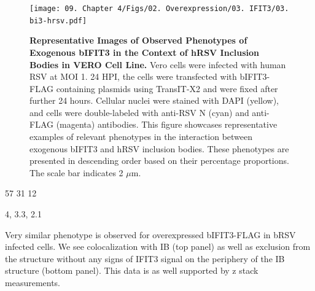\begin{figure}
    \centering
    \texttt{[image: 09. Chapter 4/Figs/02. Overexpression/03. IFIT3/03. bi3-hrsv.pdf]}
    \caption[Representative Images of Observed Phenotypes of Exogenous bIFIT3 in the Context of hRSV Inclusion Bodies in VERO Cell Line.]{\textbf{Representative Images of Observed Phenotypes of Exogenous bIFIT3 in the Context of hRSV Inclusion Bodies in VERO Cell Line.} Vero cells were infected with human RSV at MOI 1. 24 HPI, the cells were transfected with bIFIT3-FLAG containing plasmids using TransIT-X2 and were fixed after further 24 hours. Cellular nuclei were stained with DAPI (yellow), and cells were double-labeled with anti-RSV N (cyan) and anti-FLAG (magenta) antibodies. This figure showcases representative examples of relevant phenotypes in the interaction between exogenous bIFIT3 and hRSV inclusion bodies. These phenotypes are presented in descending order based on their percentage proportions. The scale bar indicates 2 \(\mu \mbox{m}\).}
    \label{fig:Representative Images of Observed Phenotypes of Exogenous bIFIT3 in the Context of hRSV Inclusion Bodies in VERO Cell Line}
\end{figure}

57 31 12

4, 3.3, 2.1

Very similar phenotype is observed for overexpressed bIFIT3-FLAG in bRSV infected cells. We see colocalization with IB (top panel) as well as exclusion from the structure without any signs of IFIT3 signal on the periphery of the IB structure (bottom panel). This data is as well supported by z stack measurements.

